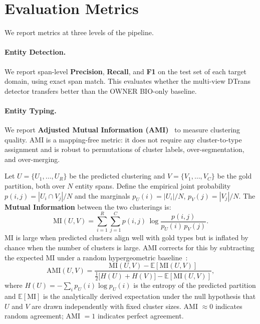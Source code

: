 \documentclass[14pt]{extreport}
\begin{document}
\section{Evaluation Metrics}

We report metrics at three levels of the pipeline.

\paragraph{Entity Detection.}
We report span-level \textbf{Precision}, \textbf{Recall}, and \textbf{F1} on the test set of each target domain, using exact span match. This evaluates whether the multi-view DTrans detector transfers better than the OWNER BIO-only baseline.

\paragraph{Entity Typing.}
We report \textbf{Adjusted Mutual Information (AMI)}~\cite{vinh-etal-2010-ami} to measure clustering quality. AMI is a mapping-free metric: it does not require any cluster-to-type assignment and is robust to permutations of cluster labels, over-segmentation, and over-merging.

Let $U = \{U_1,\ldots,U_R\}$ be the predicted clustering and $V = \{V_1,\ldots,V_C\}$ be the gold partition, both over $N$ entity spans. Define the empirical joint probability $p(i,j) = |U_i \cap V_j|/N$ and the marginals $p_U(i) = |U_i|/N$, $p_V(j) = |V_j|/N$. The \textbf{Mutual Information} between the two clusterings is:
\begin{equation}
    \text{MI}(U,V) = \sum_{i=1}^{R}\sum_{j=1}^{C} p(i,j)\,\log\frac{p(i,j)}{p_U(i)\,p_V(j)}.
    \label{eq:mi}
\end{equation}
MI is large when predicted clusters align well with gold types but is inflated by chance when the number of clusters is large. AMI corrects for this by subtracting the expected MI under a random hypergeometric baseline~\cite{vinh-etal-2010-ami}:
\begin{equation}
    \text{AMI}(U,V) = \frac{\text{MI}(U,V) - \mathbb{E}[\text{MI}(U,V)]}{\frac{1}{2}\bigl[H(U) + H(V)\bigr] - \mathbb{E}[\text{MI}(U,V)]},
    \label{eq:ami}
\end{equation}
where $H(U) = -\sum_i p_U(i)\log p_U(i)$ is the entropy of the predicted partition and $\mathbb{E}[\text{MI}]$ is the analytically derived expectation under the null hypothesis that $U$ and $V$ are drawn independently with fixed cluster sizes. AMI $\approx 0$ indicates random agreement; AMI $= 1$ indicates perfect agreement.
\end{document}
